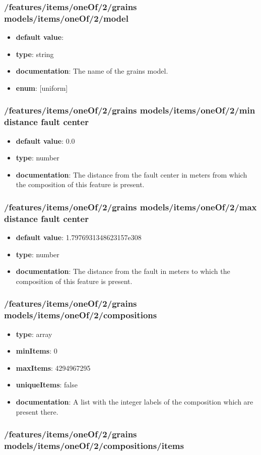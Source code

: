 \subsubsection{/features/items/oneOf/2/grains models/items/oneOf/2/model}
\begin{itemize}\item {\bf default value}: 
\item {\bf type}: string
\item {\bf documentation}: The name of the grains model.
\item {\bf enum}: [uniform]\end{itemize}\subsubsection{/features/items/oneOf/2/grains models/items/oneOf/2/min distance fault center}
\begin{itemize}\item {\bf default value}: 0.0
\item {\bf type}: number
\item {\bf documentation}: The distance from the fault center in meters from which the composition of this feature is present.
\end{itemize}\subsubsection{/features/items/oneOf/2/grains models/items/oneOf/2/max distance fault center}
\begin{itemize}\item {\bf default value}: 1.7976931348623157e308
\item {\bf type}: number
\item {\bf documentation}: The distance from the fault in meters to which the composition of this feature is present.
\end{itemize}\subsubsection{/features/items/oneOf/2/grains models/items/oneOf/2/compositions}
\begin{itemize}\item {\bf type}: array
\item {\bf minItems}: 0
\item {\bf maxItems}: 4294967295
\item {\bf uniqueItems}: false
\item {\bf documentation}: A list with the integer labels of the composition which are present there.
\end{itemize}\subsubsection{/features/items/oneOf/2/grains models/items/oneOf/2/compositions/items}
